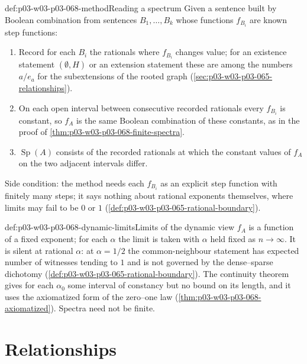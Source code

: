 \begin{hbmethod}{def:p03-w03-p03-068-method}{Reading a spectrum}
Given a sentence built by Boolean combination from sentences \(B_1,\ldots,B_k\)
whose functions \(f_{B_i}\) are known step functions:
\begin{enumerate}
\item Record for each \(B_i\) the rationals where \(f_{B_i}\) changes value;
for an existence statement \((\emptyset,H)\) or an extension statement these
are among the numbers \(a/e_a\) for the subextensions of the rooted graph
(\cref{sec:p03-w03-p03-065-relationships}).
\item On each open interval between consecutive recorded rationals every
\(f_{B_i}\) is constant, so \(f_A\) is the same Boolean combination of these
constants, as in the proof of \cref{thm:p03-w03-p03-068-finite-spectra}.
\item \(\operatorname{Sp}(A)\) consists of the recorded rationals at which the constant
values of \(f_A\) on the two adjacent intervals differ.
\end{enumerate}
Side condition: the method needs each \(f_{B_i}\) as an explicit step
function with finitely many steps; it says nothing about rational exponents
themselves, where limits may fail to be \(0\) or \(1\)
(\cref{def:p03-w03-p03-065-rational-boundary}).
\end{hbmethod}

\begin{hbwarning}{def:p03-w03-p03-068-dynamic-limits}{Limits of the dynamic view}
\(f_A\) is a function of a fixed exponent; for each \(\alpha\) the limit is
taken with \(\alpha\) held fixed as \(n\to\infty\).  It is silent at rational
\(\alpha\): at \(\alpha=1/2\) the common-neighbour statement has
expected number of witnesses tending to \(1\) and is not governed by the
dense--sparse dichotomy (\cref{def:p03-w03-p03-065-rational-boundary}).  The
continuity theorem gives for each \(\alpha_0\) some interval of constancy but
no bound on its length, and it uses the axiomatized form of the
zero--one law (\cref{thm:p03-w03-p03-068-axiomatized}).  Spectra need not be
finite.
\end{hbwarning}

\section{Relationships}
\label{sec:p03-w03-p03-068-relationships}

